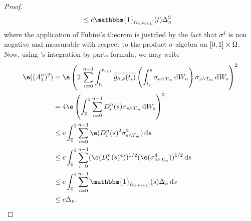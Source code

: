 \begin{proof}
\begin{align}
  & \le c \mathbbm{1}_{(t_i, t_{i+1}]}(t)\Delta_n^2 &
  \label{eq:dz}
\end{align}
where the application of Fubini's theorem \citep[Theorem VII.36.B]{Halmos1950} is justified by the fact that $\sigma^4$ is non negative and measurable with respect to the product $\sigma$-algebra on $[0,1]\times\Omega$.
Now, using \ito's integration by parts formula, we may write
\begin{align}
  \e((A_1^n)^2)  &= \e\left(2\,\sumin\int_{t_i}^{t_{i+1} }\btghki\left(\int_{t_i}^{s} \sigma_{u \wedge T_m}\D W_u\right)\sigma_{s\wedge T_m} \D W_s\right)^2\notag \\
  & = 4 \e\left(\int_0^{1 }\sumin D_i^n(s) \sigma_{s\wedge T_m} \D W_s\right)^2 \notag \\
  & \le c \int_0^{1 }\sumin\e( D_i^n(s)^2 \sigma_{s\wedge T_m}^2) \D s  \notag \\
  & \le c \int_0^{1 }\sumin(\e( D_i^n(s)^4))^{1/2} (\e( \sigma_{s\wedge T_m}^4))^{1/2} \D s  \notag \\
  & \le  c \int_0^{1 }\sumin \mathbbm{1}_{(t_i, t_{i+1}]}(s)\Delta_n  \D s  \notag \\
  & \le  c \Delta_n.  \notag 
  \label{}
\end{align}
\begin{comment}
We now note that since $4 \int_0^{1 }\left(\sumin D_i^n(s) \sigma_s\right)^2 \D s$ is increasing finite and continuous, it is locally bounded and therefore locally integrable. It is thus the case that the process defined by, $A_1^n(t) := 2 \int_0^{t}\sumin D_i^n(s) \sigma_s \D W_s$, $t \in \domain$, is a continuous local martingale. As such  $A_1^n(\cdot)$ is locally square integrable with predictable quadratic variation given by    $\langle A_1^n(\cdot) \rangle := 4 \int_0^{\cdot }\left(\sumin D_i^n(s) \sigma_s\right)^2 \D s$. Now let $\{T_n\}$ be a localizing sequence for $A_1^n(\cdot)$, then for any bounded stopping time $T$, we have
$  \e((A_1^n(T\wedge T_n) )^2) = \e(\langle A_1^n (\cdot) \rangle_{T \wedge T_n})$. By Fatou's Lemma $  \e( (A_1^n(T) )^2)  \le \e(\langle A_1^n(\cdot) \rangle_T)$. In other words $(A_1^n(\cdot))^2$ is L-dominated\footnote{The Lenglart domination property is defined in \citet[I.3.29]{Jacod2003}. } by $\langle A_1^n(\cdot) \rangle$.   


\end{comment}
\end{proof}
